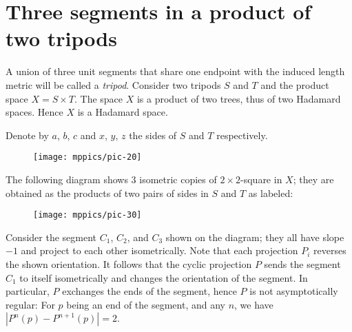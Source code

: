 \documentclass[a4paper,10pt]{article}
\begin{document}
\section{Three segments in a product of two tripods}\label{sec:tripods}

A union of three unit segments that share one endpoint with the induced length metric will be called a \emph{tripod}.  
Consider two tripods $S$ and $T$ and the product space $X= S\times T$. The space $X$ is a product of two trees, thus of two Hadamard spaces. Hence $X$ is a Hadamard space.



Denote by $a$, $b$, $c$ and $x$, $y$, $z$ the sides of $S$ and $T$ respectively.
\begin{figure}[h!]
\vskip0mm
\centering
\texttt{[image: mppics/pic-20]}
\end{figure}

The following diagram shows 3 isometric copies of $2{\times}2$-square in $X$; they are obtained as the products of two pairs of sides in $S$ and $T$ as labeled:
\begin{figure}[ht!]
\vskip0mm
\centering
\texttt{[image: mppics/pic-30]}
\end{figure}

Consider the segment $C_1$, $C_2$, and $C_3$ shown on the diagram;
they all have slope $-1$ and project to each other isometrically.
Note that each projection $P_i$ reverses the shown orientation.
It follows that the cyclic projection $P$ sends the segment  $C_1$ to itself isometrically and changes the orientation of the segment. In particular, $P$ exchanges the ends of the segment, hence $P$ is not asymptotically regular: For $p$ being an end of the segment, and any $n$, we have 
 $|P^n (p)-P^{n+1}(p)|=2$.
  







\end{document}
